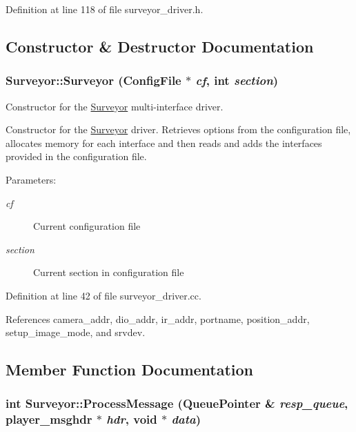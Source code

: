 Definition at line 118 of file surveyor\_\-driver.h.

\subsection{Constructor \& Destructor Documentation}
\hypertarget{classSurveyor_b0792137ec4760d15de63856ebeb7464}{
\subsubsection[{Surveyor}]{\setlength{\rightskip}{0pt plus 5cm}Surveyor::Surveyor (ConfigFile $\ast$ {\em cf}, \/  int {\em section})}}
\label{classSurveyor_b0792137ec4760d15de63856ebeb7464}


Constructor for the \hyperlink{classSurveyor}{Surveyor} multi-interface driver. 

Constructor for the \hyperlink{classSurveyor}{Surveyor} driver. Retrieves options from the configuration file, allocates memory for each interface and then reads and adds the interfaces provided in the configuration file.

\begin{Desc}
\item[Parameters:]
\begin{description}
\item[{\em cf}]Current configuration file \item[{\em section}]Current section in configuration file \end{description}
\end{Desc}


Definition at line 42 of file surveyor\_\-driver.cc.

References camera\_\-addr, dio\_\-addr, ir\_\-addr, portname, position\_\-addr, setup\_\-image\_\-mode, and srvdev.

\subsection{Member Function Documentation}
\hypertarget{classSurveyor_9af107b9b363d15951303c3cbaf4328f}{
\subsubsection[{ProcessMessage}]{\setlength{\rightskip}{0pt plus 5cm}int Surveyor::ProcessMessage (QueuePointer \& {\em resp\_\-queue}, \/  player\_\-msghdr $\ast$ {\em hdr}, \/  void $\ast$ {\em data})}}
\label{classSurveyor_9af107b9b363d15951303c3cbaf4328f}


